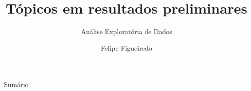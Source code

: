 \documentclass{beamer}
\title%
{Tópicos em resultados preliminares}
\subtitle
{Análise Exploratória de Dados} %
\author%
{Felipe Figueiredo}%
\institute[INTO] %
{Instituto Nacional de Traumatologia e Ortopedia
}
\date%
{}
\begin{document}
\begin{frame}
  \titlepage
\end{frame}

\begin{frame}{Sumário}
  \tableofcontents
\end{frame}








\end{document}
